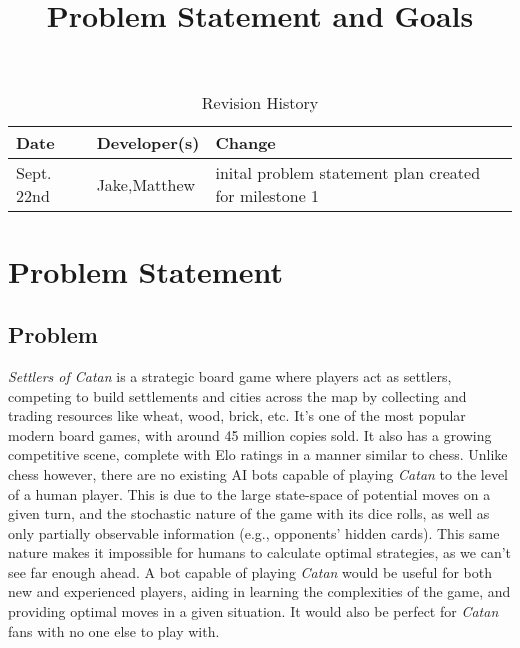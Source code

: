 \documentclass{article}
\title{Problem Statement and Goals\\\progname}
\author{\authname}
\date{}
\begin{document}
\maketitle

\begin{table}[hp]
\caption{Revision History} \label{TblRevisionHistory}
\begin{tabularx}{\textwidth}{llX}
\toprule
\textbf{Date} & \textbf{Developer(s)} & \textbf{Change}\\
\midrule
Sept. 22nd & Jake,Matthew & inital problem statement plan created for milestone 1\\
\bottomrule
\end{tabularx}
\end{table}

\section{Problem Statement}\label{sec:problem-statement}

\subsection{Problem}
\emph{Settlers of Catan} is a strategic board game where players act as settlers, competing to build settlements and cities across the map by collecting and trading resources like wheat, wood, brick, etc.
It's one of the most popular modern board games, with around 45 million copies sold.
It also has a growing competitive scene, complete with Elo ratings in a manner similar to chess.
Unlike chess however, there are no existing AI bots capable of playing \emph{Catan} to the level of a human player.
This is due to the large state-space of potential moves on a given turn, and the stochastic nature of the game with its dice rolls, as well as only partially observable information (e.g., opponents' hidden cards).
This same nature makes it impossible for humans to calculate optimal strategies, as we can't see far enough ahead.
A bot capable of playing \emph{Catan} would be useful for both new and experienced players, aiding in learning the complexities of the game, and providing optimal moves in a given situation.
It would also be perfect for \emph{Catan} fans with no one else to play with.


\end{document}
